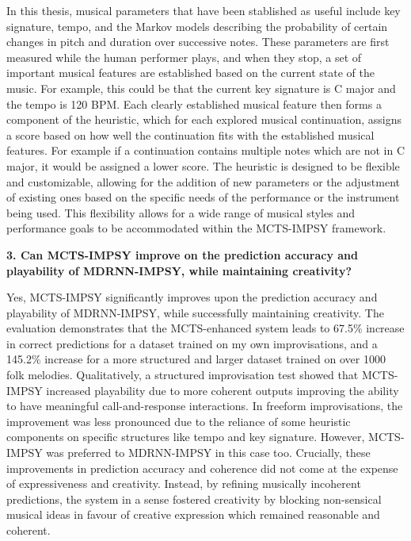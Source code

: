 In this thesis, musical parameters that have been stablished as useful include key signature, tempo, and the Markov models describing the probability of certain changes in pitch and duration over successive notes. These parameters are first measured while the human performer plays, and when they stop, a set of important musical features are established based on the current state of the music. For example, this could be that the current key signature is C major and the tempo is 120 BPM. Each clearly established musical feature then forms a component of the heuristic, which for each explored musical continuation, assigns a score based on how well the continuation fits with the established musical features. For example if a continuation contains multiple notes which are not in C major, it would be assigned a lower score. The heuristic is designed to be flexible and customizable, allowing for the addition of new parameters or the adjustment of existing ones based on the specific needs of the performance or the instrument being used. This flexibility allows for a wide range of musical styles and performance goals to be accommodated within the MCTS-IMPSY framework.

\textbf{3. Can MCTS-IMPSY improve on the prediction accuracy and playability of MDRNN-IMPSY, while maintaining creativity?}

Yes, MCTS-IMPSY significantly improves upon the prediction accuracy and playability of MDRNN-IMPSY, while successfully maintaining creativity. The evaluation demonstrates that the MCTS-enhanced system leads to 67.5\% increase in correct predictions for a dataset trained on my own improvisations, and a 145.2\% increase for a more structured and larger dataset trained on over 1000 folk melodies. Qualitatively, a structured improvisation test showed that MCTS-IMPSY increased playability due to more coherent outputs improving the ability to have meaningful call-and-response interactions. In freeform improvisations, the improvement was less pronounced due to the reliance of some heuristic components on specific structures like tempo and key signature. However, MCTS-IMPSY was preferred to MDRNN-IMPSY in this case too. Crucially, these improvements in prediction accuracy and coherence did not come at the expense of expressiveness and creativity. Instead, by refining musically incoherent predictions, the system in a sense fostered creativity by blocking non-sensical musical ideas in favour of creative expression which remained reasonable and coherent.




